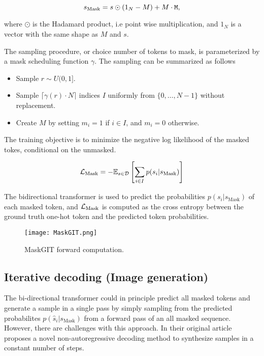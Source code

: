 \documentclass[../../thesis.tex]{subfiles}
\begin{document}
\begin{equation}
    s_\text{Mask} = s\odot (1_N-M) +  M\cdot\texttt{M},
\end{equation}

where $\odot$ is the Hadamard product, i.e point wise multiplication, and $1_N$ is a vector with the same shape as $M$ and $s$.\newline

The sampling procedure, or choice number of tokens to mask, is parameterized by a mask scheduling function $\gamma$. The sampling can be summarized as follows

\begin{itemize}
    \item Sample $r \sim U(0,1]$.
    \item Sample $\lceil \gamma(r)\cdot N \rceil$ indices $I$ uniformly from $\{0,\dots,N-1\}$ without replacement. 
    \item Create $M$ by setting $m_i = 1$ if $i\in I$, and $m_i = 0$ otherwise.
\end{itemize}

The training objective is to minimize the negative log likelihood of the masked tokes, conditional on the unmasked. 

\begin{equation}
    \mathcal{L}_\text{Mask} = -\mathbb{E}_{s\in \mathcal{D}}\left[\sum_{i \in I} p(s_i|s_\text{Mask} ) \right]
\end{equation}

The bidirectional transformer is used to predict the probabilities $p(s_i|s_\text{Mask})$ of each masked token, and $\mathcal{L}_\text{Mask}$ is computed as the cross entropy between the ground truth one-hot token and the predicted token probabilities.

\begin{figure}[h]
    \texttt{[image: MaskGIT.png]}
    \centering 
    \label{fig:MaskGIT}
    \caption{MaskGIT forward computation.}
\end{figure}

\subsection{Iterative decoding (Image generation)}

The bi-directional transformer could in principle predict all masked tokens and generate a sample in a single pass by simply sampling from the predicted probabilites $p(\widehat{s}_i|s_\text{Mask})$ from a forward pass of an all masked sequence. However, there are challenges with this approach. In their original article \cite{chang2022maskgit} proposes a novel non-autoregressive decoding method to synthesize samples in a constant number of steps.\newline
\end{document}
